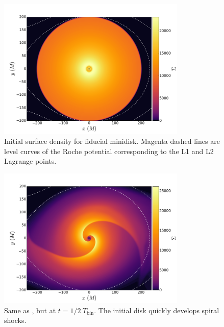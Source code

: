 \begin{figure}
\begin{center}
\includegraphics[width=0.8\textwidth]{figures/minidisk/q011_m3_sig_0000.pdf}
\end{center}
\caption{ Initial surface density for fiducial minidisk.  Magenta dashed lines are level curves of the Roche potential corresponding to the L1 and L2 Lagrange points.}
\end{figure}

\begin{figure}
\begin{center}
\includegraphics[width=0.8\textwidth]{figures/minidisk/q011_m3_sig_0050.pdf}
\end{center}
\caption{ Same as , but at $t = 1/2\ T_\text{bin}$.  The initial disk quickly develops spiral shocks.}
\end{figure}

